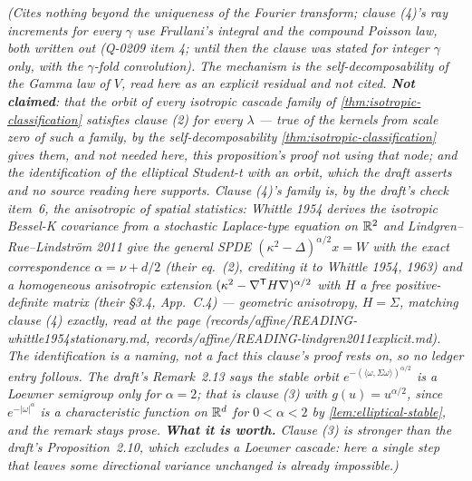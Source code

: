 \begin{proposition}
\statusT\quad\emph{(Cites nothing beyond the uniqueness of the Fourier transform; clause (4)'s
ray increments for every $\gamma$ use Frullani's integral and the compound Poisson law, both
written out (Q-0209 item 4; until then the clause was stated for integer $\gamma$ only, with the
$\gamma$-fold convolution). The mechanism is the self-decomposability of the Gamma law of $V$,
read here as an explicit residual and not cited.
\textbf{Not claimed}: that the orbit of every isotropic cascade family of
\ref{thm:isotropic-classification} satisfies clause (2) for every $\lambda$ --- true of the
kernels from scale zero of such a family, by the self-decomposability \ref{thm:isotropic-classification}
gives them, and not needed here, this proposition's proof not using that node; and the identification of the elliptical Student-t with an orbit, which the
draft asserts and no source reading here supports. Clause (4)'s family \emph{is}, by the draft's
check item~6, the anisotropic \Matern{} of spatial statistics: Whittle 1954 derives the isotropic
Bessel-K covariance from a stochastic Laplace-type equation on $\mathbb{R}^2$ and Lindgren--Rue--Lindstr\"om
2011 give the general SPDE $(\kappa^2-\Delta)^{\alpha/2}x = W$ with the exact correspondence
$\alpha = \nu + d/2$ (their eq.~(2), crediting it to Whittle 1954, 1963) and a homogeneous
anisotropic extension $(\kappa^2-\nabla^{\mathsf{T}}H\nabla)^{\alpha/2}$ with $H$ a free positive-definite
matrix (their \S3.4, App.~C.4) --- geometric anisotropy, $H = \Sigma$, matching clause (4) exactly,
read at the page (records/affine/READING-whittle1954stationary.md,
records/affine/READING-lindgren2011explicit.md). The identification is a naming, not a fact this
clause's proof rests on, so no ledger entry follows. The draft's Remark~2.13 says the stable orbit
$e^{-(\langle\omega,\Sigma\omega\rangle)^{\alpha/2}}$ is a Loewner semigroup only for
$\alpha = 2$; that is clause (3) with $g(u) = u^{\alpha/2}$, since $e^{-|\omega|^\alpha}$ is a
characteristic function on $\mathbb{R}^d$ for $0 < \alpha < 2$ by \ref{lem:elliptical-stable}, and the
remark stays prose.
\textbf{What it is worth.} Clause (3) is stronger than the draft's Proposition~2.10, which excludes
a Loewner cascade: here a single step that leaves some directional variance unchanged is already
impossible.)}
\end{proposition}

